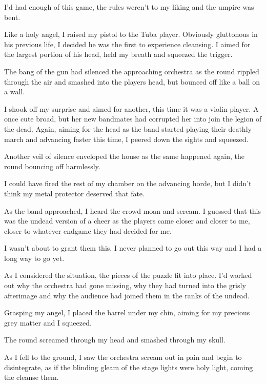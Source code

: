 I'd had enough of this game, the rules weren't to my
liking and the umpire was bent.

Like a holy angel, I raised my pistol to the Tuba player. Obviously
gluttonous in his previous life, I decided he was the first to
experience cleansing. I aimed for the largest portion of his head,
held my breath and squeezed the trigger.

The bang of the gun had silenced the approaching orchestra as the
round rippled through the air and smashed into the players head,
but bounced off like a ball on a wall.



I shook off my surprise and aimed for another, this time it was a
violin player. A once cute broad, but her new bandmates had
corrupted her into join the legion of the dead. Again, aiming for
the head as the band started playing their deathly march and
advancing faster this time, I peered down the sights and
squeezed.

Another veil of silence enveloped the house as the same happened
again, the round bouncing off harmlessly.



I could have fired the rest of my chamber on the advancing horde,
but I didn't think my metal protector deserved that
fate.

As the band approached, I heard the crowd moan and scream. I
guessed that this was the undead version of a cheer as the players
came closer and closer to me, closer to whatever endgame they had
decided for me.

I wasn't about to grant them this, I never planned to go out
this way and I had a long way to go yet.

As I considered the situation, the pieces of the puzzle fit into
place. I'd worked out why the orchestra had gone missing, why
they had turned into the grisly afterimage and why the audience had
joined them in the ranks of the undead.



Grasping my angel, I placed the barrel under my chin, aiming for my
precious grey matter and I squeezed.



The round screamed through my head and smashed through my
skull.



As I fell to the ground, I saw the orchestra scream out in pain and
begin to disintegrate, as if the blinding gleam of the stage lights
were holy light, coming the cleanse them.

